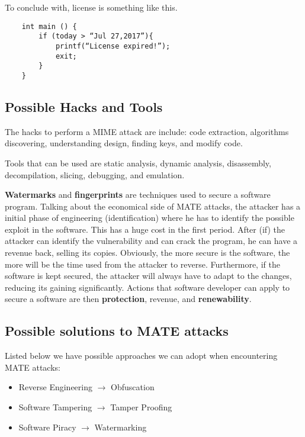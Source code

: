 To conclude with, license is something like this.

\begin{lstlisting}
    int main () {
        if (today > “Jul 27,2017”){
            printf(“License expired!”);
            exit;
        }
    }
\end{lstlisting}

\subsection{Possible Hacks and Tools}

The hacks to perform a MIME attack are include: code extraction, algorithms discovering, understanding design, finding keys, and modify code. 
\par 
Tools that can be used are static analysis, dynamic analysis, disassembly, decompilation, slicing, debugging, and emulation. 
\par \textbf{Watermarks} and \textbf{fingerprints} are techniques used to secure a software program. 
Talking about the economical side of MATE attacks, the attacker has a initial phase of engineering (identification) where he has to identify the possible exploit in the software. This has a huge cost in the first period. After (if) the attacker can identify the vulnerability and can crack the program, he can have a revenue back, selling its copies. 
Obviously, the more secure is the software, the more will be the time used from the attacker to reverse. Furthermore, if the software is kept secured, the attacker will always have to adapt to the changes, reducing its gaining significantly. Actions that software developer can apply to secure a software are then \textbf{protection}, revenue, and \textbf{renewability}. 

\subsection{Possible solutions to MATE attacks}

Listed below we have possible approaches we can adopt when encountering MATE attacks: 

\begin{itemize}
    \item Reverse Engineering $\longrightarrow$ Obfuscation
    \item Software Tampering $\longrightarrow$ Tamper Proofing
    \item Software Piracy $\longrightarrow$ Watermarking 
\end{itemize}

